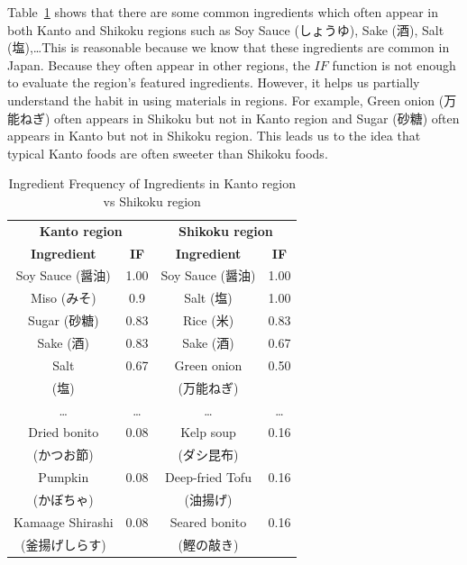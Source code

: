 \documentclass{sig-alternate}
\begin{document}
\begin{CJK}{UTF8}{min}

Table~\ref{tab:IF} shows that there are some common ingredients which often appear in both Kanto and Shikoku regions such as Soy Sauce (しょうゆ), Sake (酒), Salt (塩),\ldots This is reasonable because we know that these ingredients are common in Japan. Because they often appear in other regions, the $IF$ function is not enough to evaluate the region's featured ingredients. However, it helps us partially understand the habit in using materials in regions. For example, Green onion (万能ねぎ) often appears in Shikoku but not in Kanto region and Sugar (砂糖) often appears in Kanto but not in Shikoku region. This leads us to the idea that typical Kanto foods are often sweeter than Shikoku foods. 

\begin{table}

\centering
\caption{Ingredient Frequency of Ingredients in Kanto region vs Shikoku region}
\begin{tabular}{|c|c|c|c|}
\hline
\multicolumn{2}{|c|}{\textbf{\large Kanto region}} & \multicolumn{2}{|c|}{\textbf{\large Shikoku region}} \\
\cline{1-4}

\textbf{Ingredient} &\textbf{ IF} & \textbf{Ingredient} & \textbf{IF}\\ \hline
Soy Sauce (醤油) 	& 1.00 & Soy Sauce (醤油) & 1.00 \\ \hline
Miso (みそ)			& 0.9  &	 Salt (塩)	& 1.00  \\ \hline
Sugar (砂糖) 			& 0.83 & Rice (米) & 0.83 \\ \hline
Sake (酒)				& 0.83 & Sake (酒) & 0.67\\ \hline
Salt 			& 0.67 & Green onion & 0.50\\
(塩) & & (万能ねぎ) & \\ \hline
\ldots &\ldots & \ldots & \ldots \\ \hline
Dried bonito  			& 0.08 	& Kelp soup 	& 0.16  \\ 
(かつお節) & & (ダシ昆布) & \\ \hline
Pumpkin 			& 0.08 & Deep-fried Tofu 	& 0.16  \\ 
(かぼちゃ)  & & (油揚げ) & \\ \hline
Kamaage Shirashi  & 0.08 & Seared bonito  & 0.16  \\ 
(釜揚げしらす)  & & (鰹の敲き) & \\\hline		

\end{tabular}

\label{tab:IF}
\end{table}

\end{CJK}
\end{document}
